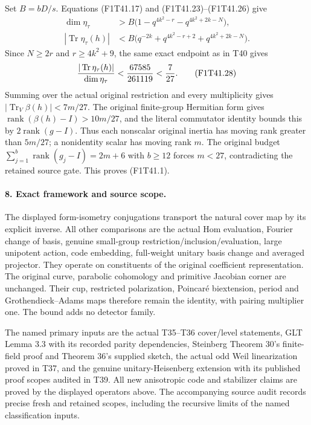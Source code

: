Set \(B=bD/s\). Equations (F1T41.17) and
(F1T41.23)--(F1T41.26) give
\[
\begin{split}
 \dim\eta_\tau&>
 B\bigl(1-q^{4k^2-r}-q^{4k^2+2k-N}\bigr),\\
 |\operatorname{Tr}\eta_\tau(h)|&<
 B\bigl(q^{-2k}+q^{4k^2-r+2}+q^{4k^2+2k-N}\bigr).
\end{split}
 \tag{F1T41.27}
\]
Since \(N\ge2r\) and \(r\ge4k^2+9\), the
same exact endpoint as in T40 gives
\[
          { |\operatorname{Tr}\eta_\tau(h)|\over\dim\eta_\tau}
                          <{67585\over261119}<{7\over27}.
 \tag{F1T41.28}
\]
Summing over the actual original restriction
and every multiplicity gives
\( |\operatorname{Tr}_V\beta(h)|<7m/27\).
The original finite-group Hermitian form gives
\(\operatorname{rank}(\beta(h)-I)>10m/27\), and
the literal commutator identity bounds this by
\(2\operatorname{rank}(g-I)\).
Thus each nonscalar original inertia has moving
rank greater than \(5m/27\); a nonidentity scalar
has moving rank \(m\). The original budget
\(\sum_{j=1}^b\operatorname{rank}(g_j-I)=2m+6\)
with \(b\ge12\) forces \(m<27\), contradicting
the retained source gate. This proves (F1T41.1).

\paragraph{8. Exact framework and source scope.}
The displayed form-isometry conjugations transport
the natural cover map by its explicit inverse.
All other comparisons are the actual Hom
evaluation, Fourier change of basis, genuine
small-group restriction/inclusion/evaluation,
large unipotent action, code embedding, full-weight
unitary basis change and averaged projector.
They operate on constituents of the original
coefficient representation. The original curve,
parabolic cohomology and primitive Jacobian corner
are unchanged. Their cup, restricted polarization,
Poincar\'e biextension, period and Grothendieck--Adams
maps therefore remain the identity, with pairing
multiplier one. The bound adds no detector family.

The named primary inputs are the actual T35--T36
cover/level statements, GLT Lemma 3.3 with its
recorded parity dependencies, Steinberg Theorem 30's
finite-field proof and Theorem 36's supplied sketch,
the actual odd Weil linearization proved in T37,
and the genuine unitary-Heisenberg extension with its
published proof scopes audited in T39. All new anisotropic code and stabilizer
claims are proved by the displayed operators above.
The accompanying source audit records precise
fresh and retained scopes, including the recursive
limits of the named classification inputs.
